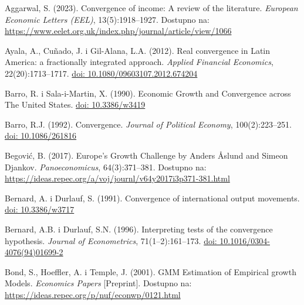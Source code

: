 \documentclass{crebsshr}
\begin{document}
\newpage

\begin{thebibliography}{99}
\small  %

Aggarwal, S. (2023). Convergence of income: A review of the literature.
\emph{European Economic Letters (EEL)}, 13(5):1918--1927.
Dostupno na: \url{https://www.eelet.org.uk/index.php/journal/article/view/1066}

Ayala, A., Cuñado, J. i Gil-Alana, L.A. (2012). Real convergence in Latin America:
a fractionally integrated approach. \emph{Applied Financial Economics}, 22(20):1713--1717.
\href{https://doi.org/10.1080/09603107.2012.674204}{doi: 10.1080/09603107.2012.674204}

Barro, R. i Sala-i-Martin, X. (1990). Economic Growth and Convergence across The United States.
\href{https://doi.org/10.3386/w3419}{doi: 10.3386/w3419}

Barro, R.J. (1992). Convergence. \emph{Journal of Political Economy}, 100(2):223--251.
\href{https://doi.org/10.1086/261816}{doi: 10.1086/261816}

Begović, B. (2017). Europe’s Growth Challenge by Anders Åslund and Simeon Djankov.
\emph{Panoeconomicus}, 64(3):371--381.
Dostupno na: \url{https://ideas.repec.org/a/voj/journl/v64y2017i3p371-381.html}

Bernard, A. i Durlauf, S. (1991). Convergence of international output movements.
\href{https://doi.org/10.3386/w3717}{doi: 10.3386/w3717}

Bernard, A.B. i Durlauf, S.N. (1996). Interpreting tests of the convergence hypothesis.
\emph{Journal of Econometrics}, 71(1--2):161--173.
\href{https://doi.org/10.1016/0304-4076(94)01699-2}{doi: 10.1016/0304-4076(94)01699-2}

Bond, S., Hoeffler, A. i Temple, J. (2001). GMM Estimation of Empirical growth Models.
\emph{Economics Papers} [Preprint].
Dostupno na: \url{https://ideas.repec.org/p/nuf/econwp/0121.html}


\end{thebibliography}
\end{document}
